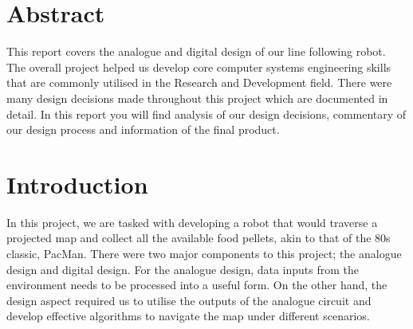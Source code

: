 \section{Abstract}
This report covers the analogue and digital design of our line following robot. The overall project helped us develop core computer systems engineering skills that are commonly utilised in the Research and Development field. There were many design decisions made throughout this project which are documented in detail. In this report you will find analysis of our design decisions, commentary of our design process and information of the final product.

\section{Introduction}
In this project, we are tasked with developing a robot that would traverse a projected map and collect all the available food pellets, akin to that of the 80s classic, PacMan. There were two major components to this project; the analogue design and digital design. For the analogue design, data inputs from the environment needs to be processed into a useful form. On the other hand, the design aspect required us to utilise the outputs of the analogue circuit and develop effective algorithms to navigate the map under different scenarios.